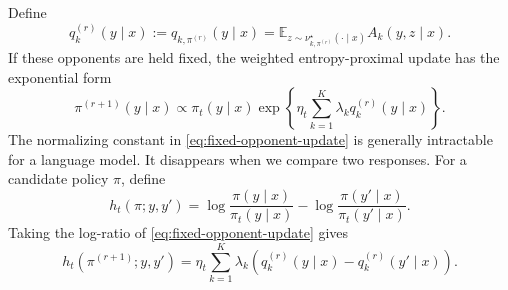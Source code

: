 \documentclass{article}
\theoremstyle{remark}
\theoremstyle{plain}
\newcommand{\E}{\mathbb{E}}
\begin{document}
Define
\[
q_k^{(r)}(y\mid x)
:=
q_{k,\pi^{(r)}}(y\mid x)
=
\E_{z\sim\nu^\star_{k,\pi^{(r)}}(\cdot\mid x)}
A_k(y,z\mid x).
\]
If these opponents are held fixed, the weighted entropy-proximal update has the
exponential form
\begin{equation}
\pi^{(r+1)}(y\mid x)
\propto
\pi_t(y\mid x)
\exp\left\{
\eta_t\sum_{k=1}^K\lambda_k q_k^{(r)}(y\mid x)
\right\}.
\label{eq:fixed-opponent-update}
\end{equation}
The normalizing constant in \eqref{eq:fixed-opponent-update} is generally
intractable for a language model. It disappears when we compare two responses.
For a candidate policy $\pi$, define
\begin{equation}
h_t(\pi;y,y')
=
\log\frac{\pi(y\mid x)}{\pi_t(y\mid x)}
-
\log\frac{\pi(y'\mid x)}{\pi_t(y'\mid x)}.
\label{eq:log-ratio-change}
\end{equation}
Taking the log-ratio of \eqref{eq:fixed-opponent-update} gives
\begin{equation}
h_t(\pi^{(r+1)};y,y')
=
\eta_t\sum_{k=1}^K\lambda_k
\left(
q_k^{(r)}(y\mid x)-q_k^{(r)}(y'\mid x)
\right).
\label{eq:fixed-opponent-pairwise}
\end{equation}
\end{document}
